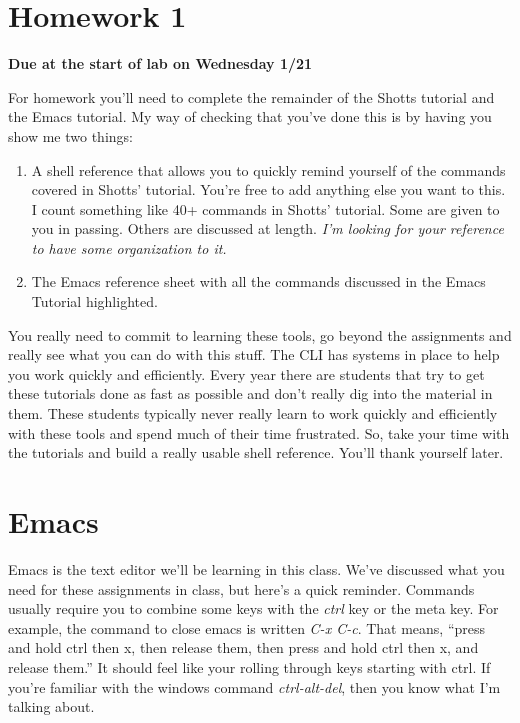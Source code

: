 \documentclass[]{tufte-handout}
\begin{document}
\section{Homework 1}

\begin{center}
\textbf{Due at the start of lab on Wednesday 1/21}
\end{center}

For homework you'll need to complete the remainder of the Shotts tutorial and the Emacs tutorial.  My way of checking that you've done this is by having you show me two things:

\begin{enumerate}
\item A shell reference that allows you to quickly remind yourself of the commands covered in Shotts' tutorial. You're free to add anything else you want to this. I count something like 40+ commands in Shotts' tutorial. Some are given to you in passing. Others are discussed at length.  \textit{I'm looking for your reference to have some organization to it.}

\item The Emacs reference sheet with all the commands discussed in the Emacs Tutorial highlighted.  
\end{enumerate}

You really need to commit to learning these tools, go beyond the assignments and really see what you can do with this stuff. The CLI has systems in place to help you work quickly and efficiently. Every year there are students that try to get these tutorials done as fast as possible and don't really dig into the material in them. These students typically never really learn to work quickly and efficiently with these tools and spend much of their time frustrated. So, take your time with the tutorials and build a really usable shell reference. You'll thank yourself later. 

\section{Emacs}

Emacs is the text editor we'll be learning in this class. We've discussed what you need for these assignments in class, but here's a quick reminder. Commands usually require you to combine some keys with the \textit{ctrl} key or the meta key. For example, the command to close emacs is written \textit{C-x C-c}. That means, ``press and hold ctrl then x, then release them, then press and hold ctrl then x, and release them.''  It should feel like your rolling through keys starting with ctrl.  If you're familiar with the windows command \textit{ctrl-alt-del}, then you know what I'm talking about. 
\end{document}
